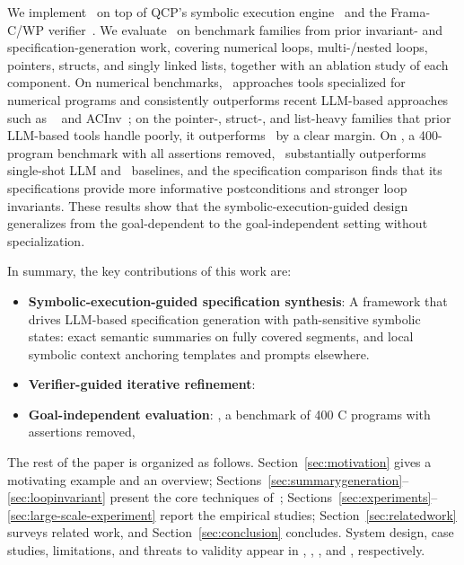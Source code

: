 We implement \toolname\ on top of QCP's symbolic execution engine~\cite{vst-a,wu2025qcppracticalseparationlogicbased} and the Frama-C/WP verifier~\cite{cuoq2012frama}.
We evaluate \toolname\ on benchmark families from prior invariant- and specification-generation work, covering numerical loops, multi-/nested loops, pointers, structs, and singly linked lists, together with an ablation study of each component. On numerical benchmarks, \toolname\ approaches tools specialized for numerical programs and consistently outperforms recent LLM-based approaches such as \autospec~\cite{autospec} and ACInv~\cite{Enhancing_Automated_Loop_Invariant_Generation_for_Complex_Programs_with_Large_Language_Models}; on the pointer-, struct-, and list-heavy families that prior LLM-based tools handle poorly, it outperforms \autospec\ by a clear margin. On \textbf{}, a 400-program benchmark with all assertions removed, \toolname\ substantially outperforms single-shot LLM and \autospec\ baselines, and the specification
comparison finds that its specifications provide more informative postconditions and stronger loop invariants. These results show that the symbolic-execution-guided design generalizes from the goal-dependent to the goal-independent setting without specialization.

In summary, the key contributions of this work are:
\begin{itemize}
\item \textbf{Symbolic-execution-guided specification synthesis}: 
A framework that drives LLM-based specification generation with path-sensitive symbolic states: exact semantic summaries on fully covered segments, and local symbolic context anchoring templates and prompts elsewhere.
\item \textbf{Verifier-guided iterative refinement}: 
\item \textbf{Goal-independent evaluation}: \textbf{}, a benchmark of 400 C programs with assertions removed, 
\end{itemize}

The rest of the paper is organized as follows. Section~\ref{sec:motivation} gives a motivating example and an overview; Sections~\ref{sec:summarygeneration}--\ref{sec:loopinvariant} present the core techniques of\ \toolname; Sections~\ref{sec:experiments}--\ref{sec:large-scale-experiment} report the empirical studies; Section~\ref{sec:relatedwork} surveys related work, and Section~\ref{sec:conclusion} concludes. System design, case studies, limitations, and threats to validity appear in , , , and , respectively.
